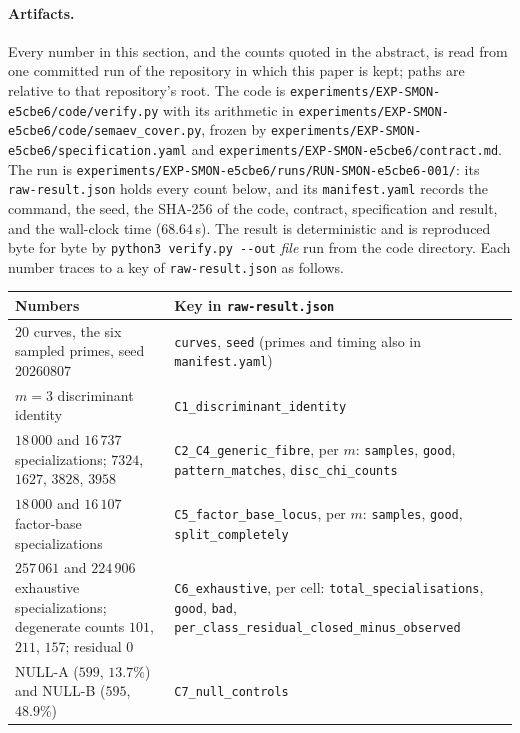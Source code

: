 \documentclass[11pt,a4paper]{article}
\theoremstyle{plain}
\theoremstyle{definition}
\begin{document}
\paragraph{Artifacts.}
{\raggedright Every number in this section, and the counts quoted in the abstract, is read
from one committed run of the repository in which this paper is kept; paths are
relative to that repository's root. The code is
\nolinkurl{experiments/EXP-SMON-e5cbe6/code/verify.py} with its arithmetic in
\nolinkurl{experiments/EXP-SMON-e5cbe6/code/semaev_cover.py}, frozen by
\nolinkurl{experiments/EXP-SMON-e5cbe6/specification.yaml} and
\nolinkurl{experiments/EXP-SMON-e5cbe6/contract.md}. The run is
\nolinkurl{experiments/EXP-SMON-e5cbe6/runs/RUN-SMON-e5cbe6-001/}: its
\nolinkurl{raw-result.json} holds every count below, and its
\nolinkurl{manifest.yaml} records the command, the seed, the SHA-256 of the code,
contract, specification and result, and the wall-clock time ($68.64$\,s).
The result is deterministic and is reproduced byte for byte by
\texttt{python3 verify.py -{}-out} \textit{file} run from the code directory.
Each number traces to a key of \nolinkurl{raw-result.json} as follows.\par}
\begin{center}
\small
\begin{tabular}{@{}>{\raggedright\arraybackslash}p{}
                >{\raggedright\arraybackslash}p{}@{}}
\toprule
Numbers & Key in \nolinkurl{raw-result.json} \\
\midrule
$20$ curves, the six sampled primes, seed $20260807$
  & \nolinkurl{curves}, \nolinkurl{seed} (primes and timing also in \nolinkurl{manifest.yaml}) \\
$m=3$ discriminant identity
  & \nolinkurl{C1_discriminant_identity} \\
$18\,000$ and $16\,737$ specializations; $7324$, $1627$, $3828$, $3958$
  & \nolinkurl{C2_C4_generic_fibre}, per $m$: \nolinkurl{samples}, \nolinkurl{good},
    \nolinkurl{pattern_matches}, \nolinkurl{disc_chi_counts} \\
$18\,000$ and $16\,107$ factor-base specializations
  & \nolinkurl{C5_factor_base_locus}, per $m$: \nolinkurl{samples}, \nolinkurl{good},
    \nolinkurl{split_completely} \\
$257\,061$ and $224\,906$ exhaustive specializations; degenerate counts $101$,
$211$, $157$; residual $0$
  & \nolinkurl{C6_exhaustive}, per cell: \nolinkurl{total_specialisations},
    \nolinkurl{good}, \nolinkurl{bad},
    \nolinkurl{per_class_residual_closed_minus_observed} \\
NULL-A ($599$, $13.7\%$) and NULL-B ($595$, $48.9\%$)
  & \nolinkurl{C7_null_controls} \\
\bottomrule
\end{tabular}
\end{center}
\end{document}
